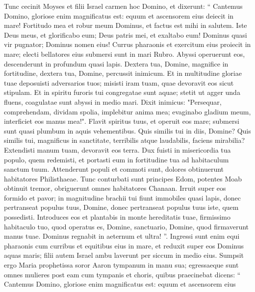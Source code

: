 \begin{biblechapter}
\begin{biblechapter}
\begin{biblechapter}
\begin{biblechapter}
\begin{biblechapter}
\begin{biblechapter}
\begin{biblechapter}
\begin{biblechapter}
\begin{biblechapter}
\begin{biblechapter}
\begin{biblechapter}
\begin{biblechapter}
\begin{biblechapter}
\begin{biblechapter}
\begin{biblechapter}
\verse Tunc cecinit Moyses et filii Israel carmen hoc Domino, et dixerunt:
 “ Cantemus Domino,
 gloriose enim magnificatus est:
 equum et ascensorem eius
 deiecit in mare!
 \verse Fortitudo mea et robur meum Dominus,
 et factus est mihi in salutem.
 Iste Deus meus,
 et glorificabo eum;
 Deus patris mei,
 et exaltabo eum!
 \verse Dominus quasi vir pugnator;
 Dominus nomen eius!
 \verse Currus pharaonis et exercitum eius
 proiecit in mare;
 electi bellatores eius
 submersi sunt in mari Rubro.
 \verse Abyssi operuerunt eos,
 descenderunt in profundum quasi lapis.
 \verse Dextera tua, Domine,
 magnifice in fortitudine,
 dextera tua, Domine,
 percussit inimicum.
 \verse Et in multitudine gloriae tuae
 deposuisti adversarios tuos;
 misisti iram tuam,
 quae devoravit eos sicut stipulam.
 \verse Et in spiritu furoris tui
 congregatae sunt aquae;
 stetit ut agger
 unda fluens,
 coagulatae sunt abyssi
 in medio mari.
 \verse Dixit inimicus:
 "Persequar, comprehendam,
 dividam spolia,
 implebitur anima mea;
 evaginabo gladium meum,
 interficiet eos manus mea!".
 \verse Flavit spiritus tuus,
 et operuit eos mare;
 submersi sunt quasi plumbum
 in aquis vehementibus.
 \verse Quis similis tui
 in diis, Domine?
 Quis similis tui,
 magnificus in sanctitate,
 terribilis atque laudabilis,
 faciens mirabilia?
 \verse Extendisti manum tuam,
 devoravit eos terra.
 \verse Dux fuisti in misericordia tua
 populo, quem redemisti,
 et portasti eum in fortitudine tua
 ad habitaculum sanctum tuum.
 \verse Attenderunt populi et commoti sunt,
 dolores obtinuerunt habitatores Philisthaeae.
 \verse Tunc conturbati sunt principes Edom,
 potentes Moab obtinuit tremor,
 obriguerunt omnes habitatores Chanaan.
 \verse Irruit super eos
 formido et pavor;
 in magnitudine brachii tui
 fiunt immobiles quasi lapis,
 donec pertranseat populus tuus, Domine,
 donec pertranseat populus tuus iste,
 quem possedisti.
 \verse Introduces eos et plantabis
 in monte hereditatis tuae,
 firmissimo habitaculo tuo,
 quod operatus es, Domine,
 sanctuario, Domine,
 quod firmaverunt manus tuae.
 \verse Dominus regnabit
 in aeternum et ultra! ”.
 \verse Ingressi sunt enim equi pharaonis cum curribus et equitibus eius in mare, et reduxit super eos Dominus aquas maris; filii autem Israel ambu laverunt per siccum in medio eius. 
\verse Sumpsit ergo Maria prophetissa soror Aaron tympanum in manu sua; egressaeque sunt omnes mulieres post eam cum tympanis et choris, 
 \verse quibus praecinebat dicens:
 “ Cantemus Domino,
 gloriose enim magnificatus est:
 equum et ascensorem eius

\end{biblechapter}
\end{biblechapter}
\end{biblechapter}
\end{biblechapter}
\end{biblechapter}
\end{biblechapter}
\end{biblechapter}
\end{biblechapter}
\end{biblechapter}
\end{biblechapter}
\end{biblechapter}
\end{biblechapter}
\end{biblechapter}
\end{biblechapter}
\end{biblechapter}
